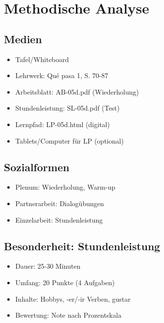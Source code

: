 \documentclass[11pt,a4paper]{article}
\newcommand{\lehrwerk}{Qué pasa 1}
\newcommand{\lehrwerkseite}{S. 70-87}
\begin{document}
\section{Methodische Analyse}

\subsection{Medien}
\begin{itemize}
    \item Tafel/Whiteboard
    \item Lehrwerk: \lehrwerk, \lehrwerkseite
    \item Arbeitsblatt: AB-05d.pdf (Wiederholung)
    \item Stundenleistung: SL-05d.pdf (Test)
    \item Lernpfad: LP-05d.html (digital)
    \item Tablets/Computer für LP (optional)
\end{itemize}

\subsection{Sozialformen}
\begin{itemize}
    \item Plenum: Wiederholung, Warm-up
    \item Partnerarbeit: Dialogübungen
    \item Einzelarbeit: Stundenleistung
\end{itemize}

\subsection{Besonderheit: Stundenleistung}
\begin{itemize}
    \item Dauer: 25-30 Minuten
    \item Umfang: 20 Punkte (4 Aufgaben)
    \item Inhalte: Hobbys, -er/-ir Verben, gustar
    \item Bewertung: Note nach Prozentskala
\end{itemize}

\end{document}
